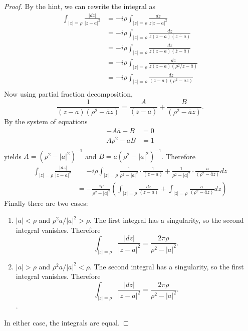 \documentclass{article}
\begin{document}
\begin{proof}
  By the hint, we can rewrite the integral as \begin{align*}
    \int_{|z|=\rho}\frac{|dz|}{|z - a|^2} &= -i\rho\int_{|z|=\rho}\frac{dz}{z|z - a|^2} \\
    &= -i\rho\int_{|z|=\rho}\frac{dz}{z(z - a)(\overline{z-a})} \\
    &= -i\rho\int_{|z|=\rho}\frac{dz}{z(z - a)(\bar{z}-\bar{a})} \\
    &= -i\rho\int_{|z|=\rho}\frac{dz}{z(z - a)(\rho^2/z-\bar{a})} \\
    &= -i\rho\int_{|z|=\rho}\frac{dz}{(z - a)(\rho^2-\bar{a}z)} \\
  \end{align*}
  Now using partial fraction decomposition, \[
    \frac{1}{(z - a)(\rho^2-\bar{a}z)} = \frac{A}{(z - a)} + \frac{B}{(\rho^2-\bar{a}z)}.
  \]
  By the system of equations \begin{align*}
    -A\bar{a} + B &= 0 \\
    A\rho^2 - aB &= 1 \\
  \end{align*} yields $A = (\rho^2 - |a|^2)^{-1}$ and $B = \bar{a}(\rho^2 - |a|^2)^{-1}$. Therefore
  \begin{align*}
    \int_{|z|=\rho}\frac{|dz|}{|z - a|^2} &= -i\rho\int_{|z|=\rho} \frac{1}{\rho^2 - |a|^2}\cdot\frac{1}{(z - a)} + \frac{1}{\rho^2 - |a|^2}\cdot\frac{\bar{a}}{(\rho^2-\bar{a}z)} dz\\
    &= -\frac{i\rho}{\rho^2 - |a|^2}\left(\int_{|z|=\rho} \frac{dz}{(z - a)} + \int_{|z|=\rho}\frac{\bar{a}}{(\rho^2-\bar{a}z)} dz\right)
  \end{align*}
  Finally there are two cases: \begin{enumerate}
    \item $|a| < \rho$ and $\rho^2a/|a|^2 > \rho$. The first integral has a
      singularity, so the second integral vanishes. Therefore \[
        \int_{|z|=\rho}\frac{|dz|}{|z - a|^2} = \frac{2\pi\rho}{\rho^2 - |a|^2}.
      \]
    \item $|a| > \rho$ and $\rho^2a/|a|^2 < \rho$. The second integral has a
      singularity, so the first integral vanishes. Therefore \[
        \int_{|z|=\rho}\frac{|dz|}{|z - a|^2} = \frac{2\pi\rho}{\rho^2 - |a|^2}.
      \].
  \end{enumerate}

  In either case, the integrals are equal.

\end{proof}
\end{document}
